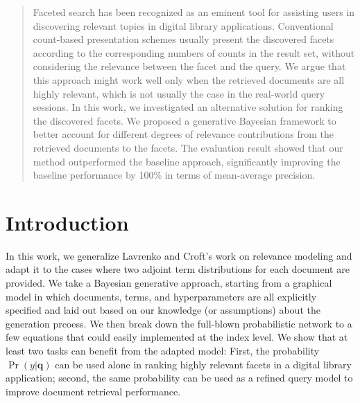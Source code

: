 \begin{abstract} Faceted search has been recognized as an eminent tool for
assisting users in discovering relevant topics in digital library applications.
Conventional count-based presentation schemes usually present the discovered
facets according to the corresponding numbers of counts in the result set,
without considering the relevance between the facet and the query.  We argue
that this approach might work well only when the retrieved documents are all
highly relevant, which is not usually the case in the real-world query
sessions.  In this work, we investigated an alternative solution for ranking
the discovered facets.  We proposed a generative Bayesian framework to better
account for different degrees of relevance contributions from the retrieved
documents to the facets.  The evaluation result showed that our
method outperformed the baseline approach, significantly improving the
baseline performance by 100\% in terms of mean-average precision.
\end{abstract}

\section{Introduction}

In this work, we generalize Lavrenko and Croft's work
\cite{lavrenko2001relevance} on relevance modeling and adapt it to the cases
where two adjoint term distributions for each document are provided.  We take a
Bayesian generative approach, starting from a graphical model in which
documents, terms, and hyperparameters are all explicitly specified and laid out
based on our knowledge (or assumptions) about the generation prcoess.  We then
break down the full-blown probabilistic network to a few equations that could
easily implemented at the index level.  We show that at least two tasks can
benefit from the adapted model: First, the probability $\Pr(y|\mathbf{q})$ can
be used alone in ranking highly relevant facets in a digital library
application; second, the same probability can be used as a refined query model
to improve document retrieval performance.

